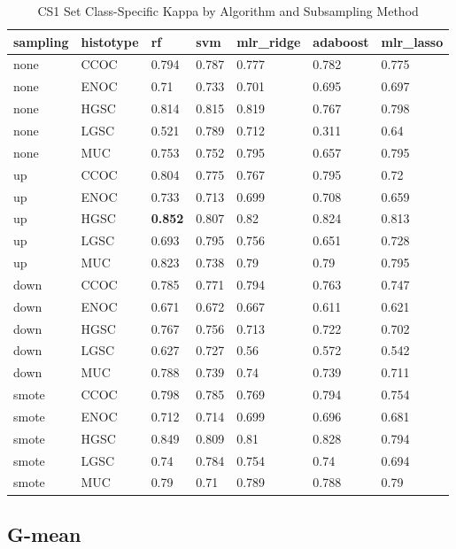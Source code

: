 \documentclass[
]{report}
\begin{document}
\begin{table}

\caption{\label{tab:cs1-kappa-class-table}CS1 Set Class-Specific Kappa by Algorithm and Subsampling Method}
\centering
\begin{tabular}[t]{l|l|l|l|l|l|l}
\hline
sampling & histotype & rf & svm & mlr\_ridge & adaboost & mlr\_lasso\\
\hline
none & CCOC & 0.794 & 0.787 & 0.777 & 0.782 & 0.775\\
\hline
none & ENOC & 0.71 & 0.733 & 0.701 & 0.695 & 0.697\\
\hline
none & HGSC & 0.814 & 0.815 & 0.819 & 0.767 & 0.798\\
\hline
none & LGSC & 0.521 & 0.789 & 0.712 & 0.311 & 0.64\\
\hline
none & MUC & 0.753 & 0.752 & 0.795 & 0.657 & 0.795\\
\hline
up & CCOC & 0.804 & 0.775 & 0.767 & 0.795 & 0.72\\
\hline
up & ENOC & 0.733 & 0.713 & 0.699 & 0.708 & 0.659\\
\hline
up & HGSC & \textbf{0.852} & 0.807 & 0.82 & 0.824 & 0.813\\
\hline
up & LGSC & 0.693 & 0.795 & 0.756 & 0.651 & 0.728\\
\hline
up & MUC & 0.823 & 0.738 & 0.79 & 0.79 & 0.795\\
\hline
down & CCOC & 0.785 & 0.771 & 0.794 & 0.763 & 0.747\\
\hline
down & ENOC & 0.671 & 0.672 & 0.667 & 0.611 & 0.621\\
\hline
down & HGSC & 0.767 & 0.756 & 0.713 & 0.722 & 0.702\\
\hline
down & LGSC & 0.627 & 0.727 & 0.56 & 0.572 & 0.542\\
\hline
down & MUC & 0.788 & 0.739 & 0.74 & 0.739 & 0.711\\
\hline
smote & CCOC & 0.798 & 0.785 & 0.769 & 0.794 & 0.754\\
\hline
smote & ENOC & 0.712 & 0.714 & 0.699 & 0.696 & 0.681\\
\hline
smote & HGSC & 0.849 & 0.809 & 0.81 & 0.828 & 0.794\\
\hline
smote & LGSC & 0.74 & 0.784 & 0.754 & 0.74 & 0.694\\
\hline
smote & MUC & 0.79 & 0.71 & 0.789 & 0.788 & 0.79\\
\hline
\end{tabular}
\end{table}

\hypertarget{g-mean-2}{%
\subsection{G-mean}\label{g-mean-2}}
\end{document}
